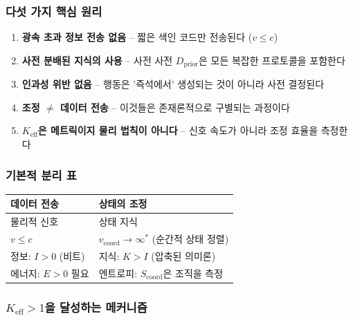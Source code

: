 \documentclass[11pt,a4paper]{article}
\begin{document}
	\subsubsection{다섯 가지 핵심 원리}
	\begin{enumerate}[leftmargin=*]
		\item \textbf{광속 초과 정보 전송 없음} – 짧은 색인 코드만 전송된다 ($v \leq c$)
		\item \textbf{사전 분배된 지식의 사용} – 사전 사전 $D_{\text{prior}}$은 모든 복잡한 프로토콜을 포함한다
		\item \textbf{인과성 위반 없음} – 행동은 '즉석에서' 생성되는 것이 아니라 사전 결정된다
		\item \textbf{조정 $\neq$ 데이터 전송} – 이것들은 존재론적으로 구별되는 과정이다
		\item \textbf{$K_{\mathrm{eff}}$은 메트릭이지 물리 법칙이 아니다} – 신호 속도가 아니라 조정 효율을 측정한다
	\end{enumerate}
	
	\subsubsection{기본적 분리 표}
	\begin{table}[H]
		\centering
		\begin{tabular}{|p{}|p{}|}
			\hline
			\textbf{데이터 전송} & \textbf{상태의 조정} \\
			\hline
			물리적 신호 & 상태 지식 \\
			$v \leq c$ & $v_{\text{coord}} \to \infty^*$ (순간적 상태 정렬) \\
			정보: $I > 0$ (비트) & 지식: $K > I$ (압축된 의미론) \\
			에너지: $E > 0$ 필요 & 엔트로피: $S_{\text{coord}}$은 조직을 측정 \\
			\hline
		\end{tabular}
	\end{table}
	
	\begin{table}
	\caption{데이터 전송과 상태 조정 사이의 기본적 존재론적 분리. *$v_{\text{coord}} \to \infty$는 사전 사전을 통한 순간적 상태 정렬을 의미하며, 물리적 신호 전파가 아니다.}
	\label{tab:coordination-vs-data}
\end{table}

\subsubsection{$K_{\mathrm{eff}} > 1$을 달성하는 메커니즘}
\end{document}
